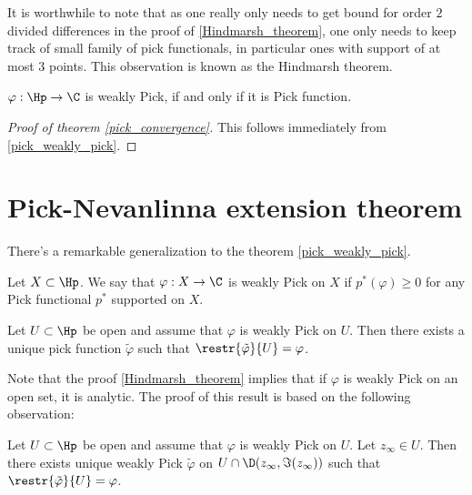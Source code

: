 It is worthwhile to note that as one really only needs to get bound for order $2$ divided differences in the proof of \ref{Hindmarsh_theorem}, one only needs to keep track of small family of pick functionals, in particular ones with support of at most $3$ points. This observation is known as the Hindmarsh theorem.

\begin{kor}\label{pick_weakly_pick}
	$\varphi : \Hp \to \C$ is weakly Pick, if and only if it is Pick function.
\end{kor}

\begin{proof}[Proof of theorem \ref{pick_convergence}]
	This follows immediately from \ref{pick_weakly_pick}.
\end{proof}

\section{Pick-Nevanlinna extension theorem}

There's a remarkable generalization to the theorem \ref{pick_weakly_pick}.

\begin{maar}
	Let $X \subset \Hp$. We say that $\varphi : X \to \C$ is weakly Pick on $X$ if $p^{*}(\varphi) \geq 0$ for any Pick functional $p^{*}$ supported on $X$.
\end{maar}

\begin{lause}\label{open_pick_interpolation}
	Let $U \subset \Hp$ be open and assume that $\varphi$ is weakly Pick on $U$. Then there exists a unique pick function $\tilde{\varphi}$ such that $\restr{\tilde{\varphi}}{U} = \varphi$.
\end{lause}

Note that the proof \ref{Hindmarsh_theorem} implies that if $\varphi$ is weakly Pick on an open set, it is analytic. The proof of this result is based on the following observation:

\begin{lem}\label{open_pick_lemma}
	Let $U \subset \Hp$ be open and assume that $\varphi$ is weakly Pick on $U$. Let $z_{\infty} \in U$. Then there exists unique weakly Pick $\tilde{\varphi}$ on $U \cap \D(z_{\infty}, \Im(z_{\infty}))$ such that $\restr{\tilde{\varphi}}{U} = \varphi$.
\end{lem}

